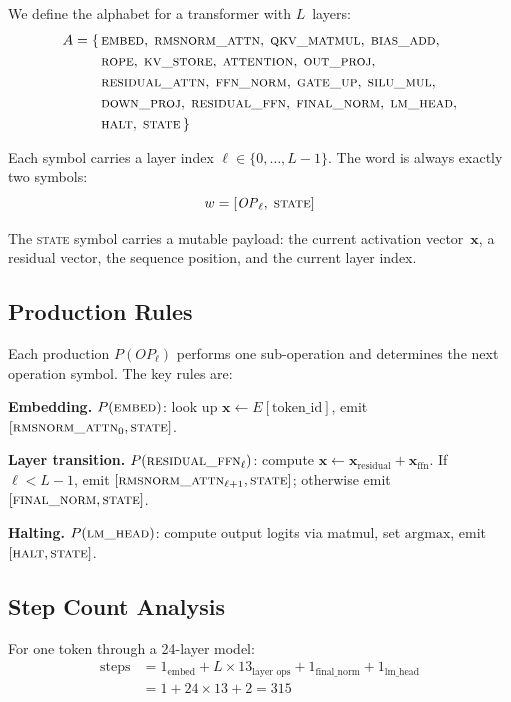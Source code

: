 \documentclass[acmsmall,nonacm]{acmart}
\begin{document}
We define the alphabet for a transformer with $L$~layers:
\begin{align*}
A = \{\, &\textsc{embed},\; \textsc{rmsnorm\_attn},\;
  \textsc{qkv\_matmul},\; \textsc{bias\_add},\\
  &\textsc{rope},\; \textsc{kv\_store},\;
  \textsc{attention},\; \textsc{out\_proj},\\
  &\textsc{residual\_attn},\; \textsc{ffn\_norm},\;
  \textsc{gate\_up},\; \textsc{silu\_mul},\\
  &\textsc{down\_proj},\; \textsc{residual\_ffn},\;
  \textsc{final\_norm},\; \textsc{lm\_head},\\
  &\textsc{halt},\; \textsc{state}\,\}
\end{align*}

Each symbol carries a layer index $\ell \in \{0, \dots, L-1\}$.
The word is always exactly two symbols:
\[
  w = [\mathit{OP}_\ell,\; \textsc{state}]
\]

The \textsc{state} symbol carries a mutable payload: the current
activation vector~$\mathbf{x}$, a residual vector, the sequence
position, and the current layer index.

\subsection{Production Rules}

Each production $P(\mathit{OP}_\ell)$ performs one sub-operation
and determines the next operation symbol.  The key rules are:

\medskip
\noindent\textbf{Embedding.}
$P(\textsc{embed})$: look up $\mathbf{x} \leftarrow E[\text{token\_id}]$,
emit $[\textsc{rmsnorm\_attn}_0, \textsc{state}]$.

\medskip
\noindent\textbf{Layer transition.}
$P(\textsc{residual\_ffn}_\ell)$: compute
$\mathbf{x} \leftarrow \mathbf{x}_\text{residual} + \mathbf{x}_\text{ffn}$.
If $\ell < L-1$, emit $[\textsc{rmsnorm\_attn}_{\ell+1}, \textsc{state}]$;
otherwise emit $[\textsc{final\_norm}, \textsc{state}]$.

\medskip
\noindent\textbf{Halting.}
$P(\textsc{lm\_head})$: compute output logits via matmul, set
$\text{argmax}$, emit $[\textsc{halt}, \textsc{state}]$.

\subsection{Step Count Analysis}

For one token through a 24-layer model:
\begin{align*}
\text{steps} &= 1_{\text{embed}} + L \times 13_{\text{layer ops}}
  + 1_{\text{final\_norm}} + 1_{\text{lm\_head}} \\
  &= 1 + 24 \times 13 + 2 = 315
\end{align*}
\end{document}
